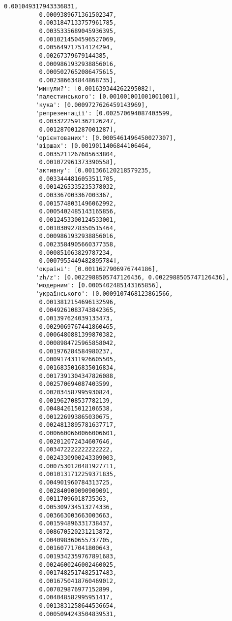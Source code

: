 \documentclass[11pt]{article}
\begin{document}
\begin{Verbatim}[commandchars=\\\{\}]
          0.001049317943336831,
          0.0009389671361502347,
          0.0031847133757961785,
          0.0035335689045936395,
          0.0010214504596527069,
          0.005649717514124294,
          0.00267379679144385,
          0.0009861932938856016,
          0.0005027652086475615,
          0.002386634844868735],
         'минули?': [0.001639344262295082],
         'палестинського': [0.001001001001001001],
         'кука': [0.0009727626459143969],
         'репрезентації': [0.002570694087403599,
          0.0033222591362126247,
          0.001287001287001287],
         'орієнтованих': [0.0005461496450027307],
         'віршах': [0.0019011406844106464,
          0.0035211267605633804,
          0.001072961373390558],
         'активну': [0.001366120218579235,
          0.0033444816053511705,
          0.0014265335235378032,
          0.003367003367003367,
          0.0015748031496062992,
          0.0005402485143165856,
          0.0012453300124533001,
          0.0010309278350515464,
          0.0009861932938856016,
          0.0023584905660377358,
          0.000851063829787234,
          0.0007955449482895784],
         'окраїні': [0.0011627906976744186],
         'zh/z': [0.0022988505747126436, 0.0022988505747126436],
         'модерним': [0.0005402485143165856],
         'українського': [0.0009107468123861566,
          0.0013812154696132596,
          0.0049261083743842365,
          0.001397624039133473,
          0.0029069767441860465,
          0.0006480881399870382,
          0.0008984725965858042,
          0.001976284584980237,
          0.0009174311926605505,
          0.0016835016835016834,
          0.0017391304347826088,
          0.002570694087403599,
          0.002034587995930824,
          0.001962708537782139,
          0.004842615012106538,
          0.001226993865030675,
          0.0024813895781637717,
          0.0006600660066006601,
          0.002012072434607646,
          0.003472222222222222,
          0.0024330900243309003,
          0.0007530120481927711,
          0.0010131712259371835,
          0.004901960784313725,
          0.002840909090909091,
          0.00117096018735363,
          0.005309734513274336,
          0.003663003663003663,
          0.001594896331738437,
          0.008670520231213872,
          0.004098360655737705,
          0.001607717041800643,
          0.0019342359767891683,
          0.0024600246002460025,
          0.0017482517482517483,
          0.0016750418760469012,
          0.007029876977152899,
          0.004048582995951417,
          0.0013831258644536654,
          0.0005094243504839531,

\end{Verbatim}
\end{document}
